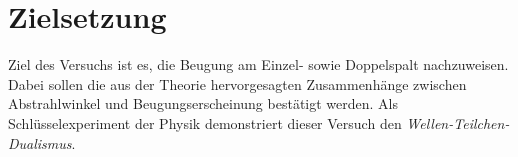 \section{Zielsetzung}
\label{sec:Zielsetzung}

Ziel des Versuchs ist es, die Beugung am Einzel- sowie Doppelspalt nachzuweisen.
Dabei sollen die aus der Theorie hervorgesagten Zusammenhänge zwischen Abstrahlwinkel und Beugungserscheinung bestätigt werden.
Als Schlüsselexperiment der Physik demonstriert dieser Versuch den \textit{Wellen-Teilchen-Dualismus}.